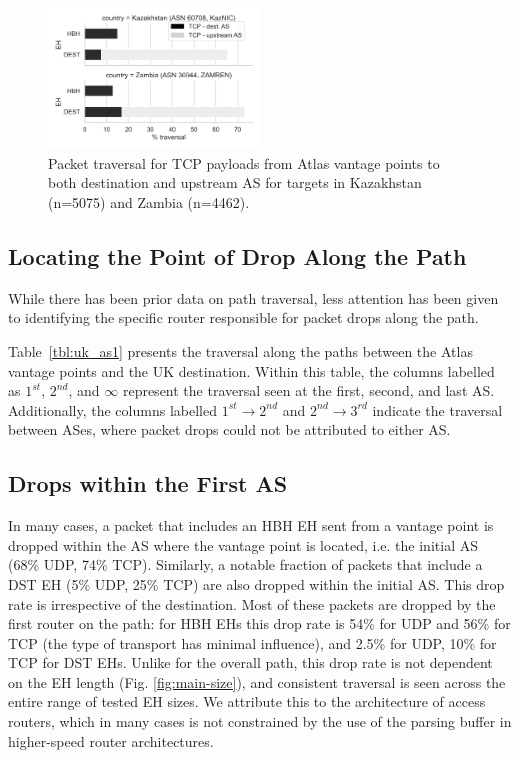 \documentclass[conference]{IEEEtran}
\begin{document}

\begin{figure}
\centering
  \includegraphics[width=0.5\textwidth]{traversal-pathologies.png}
  \caption{Packet traversal for TCP payloads from Atlas vantage points to both destination and upstream
AS for targets in Kazakhstan (n=5075) and Zambia (n=4462).}
  \label{fig:traversal_pathologies}
\end{figure}

\subsection{Locating the Point of Drop Along the Path}

While there has been prior data on path traversal, less attention has been
given to identifying the specific router responsible for packet drops along the
path.

Table~\ref{tbl:uk_as1} presents the traversal along the
paths between the Atlas vantage points and the UK destination.
Within this table, the columns labelled as $1^{st}$, $2^{nd}$, and $\infty$
represent the traversal seen at the first, second, and last AS.
Additionally, the columns labelled $1^{st}\rightarrow 2^{nd}$ and
$2^{nd}\rightarrow 3^{rd}$ indicate the traversal
between ASes, where packet drops could not be attributed to either AS.
\subsection{Drops within the First AS}
\label{subsec: asdrop}

In many cases, a packet that includes an HBH EH sent from a vantage point is dropped within the AS where the vantage point is located, i.e. the initial AS (68\% UDP, 74\% TCP). Similarly, a notable fraction of packets that include a DST EH (5\% UDP, 25\% TCP) are also dropped within the
initial AS. This drop rate is irrespective of the destination.
Most of these packets are dropped by the first router on the path: for HBH EHs this drop rate is 54\% for UDP and 56\% for TCP (the type of transport has minimal influence), and 2.5\% for UDP, 10\% for TCP for DST EHs.
Unlike for the overall path, this drop rate is not dependent on the EH length (Fig. \ref{fig:main-size}), and consistent traversal is seen across the entire range of tested EH sizes. We attribute this to the architecture of access routers, which in many cases is not constrained by the use of the parsing buffer in higher-speed router architectures.
\end{document}
